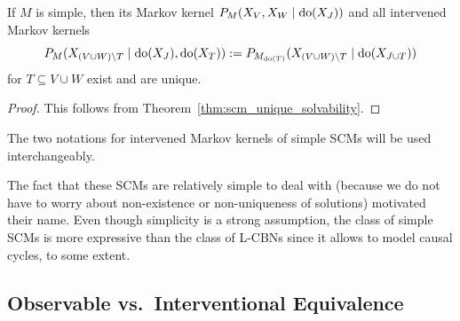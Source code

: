 \begin{Cor}\label{cor:simple_scm}
  If $M$ is simple, then its Markov kernel $P_{M}(X_V, X_W \mid \operatorname{do}(X_J))$ and all intervened Markov kernels
  $$P_{M}(X_{(V \cup W) \setminus T} \mid \operatorname{do}(X_J),\operatorname{do}(X_T)) := P_{M_{\operatorname{do}(T)}}(X_{(V \cup W)\setminus T} \mid \operatorname{do}(X_{J \cup T}))$$
  for $T \subseteq V \cup W$ exist and are unique.
\end{Cor}
\begin{proof}
  This follows from Theorem~\ref{thm:scm_unique_solvability}.
\end{proof}
The two notations for intervened Markov kernels of simple SCMs will be used interchangeably.

The fact that these SCMs are relatively simple to deal with (because we do not have to worry about non-existence or 
non-uniqueness of solutions) motivated their name.
Even though simplicity is a strong assumption, 
the class of simple SCMs is more expressive than the class of L-CBNs since it allows to model causal cycles, to some extent.

\subsection{Observable vs.\ Interventional Equivalence}

